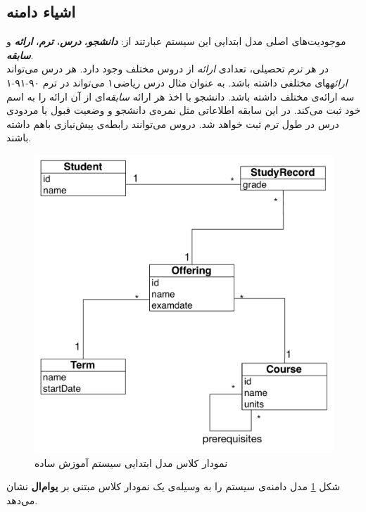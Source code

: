 \subsection{اشیاء دامنه}
\label{subsec:mainEntities}
 موجودیت‌های اصلی  مدل ابتدایی این سیستم عبارتند از:
\textbf{\textit{دانشجو}}، \textbf{\textit{درس}}، \textbf{\textit{ترم}}، \textbf{\textit{ارائه}} و \textbf{\textit{سابقه}}.\\
در هر \textit{ترم} تحصیلی، تعدادی \textit{ارائه} از دروس مختلف وجود دارد. هر درس می‌تواند \textit{ارائه}های مختلفی داشته باشد. به عنوان مثال درس ریاضی۱ می‌تواند در ترم ۹۰-۹۱-۱ سه ارائه‌ی مختلف داشته باشد. دانشجو با اخذ هر ارائه \textit{سابقه}‌ای از آن ارائه را به اسم خود ثبت می‌کند. در این سابقه اطلاعاتی مثل نمره‌ی دانشجو و وضعیت قبول یا مردودی درس در طول ترم ثبت خواهد شد. دروس می‌توانند رابطه‌ی پیش‌نیازی باهم داشته باشند. 
\begin{figure}
    \begin{center}
	\includegraphics[width=12cm]{4-ProposedFramework/Figures/SimpleClassDiagram.pdf}
    \end{center}
    \caption{\label{fig:edu_class1} نمودار کلاس مدل ابتدایی سیستم آموزش ساده }
\end{figure}
شکل \ref{fig:edu_class1} مدل دامنه‌ی سیستم را به وسیله‌ی یک نمودار کلاس مبتنی بر \textbf{یو‌ام‌ال} نشان می‌دهد.

